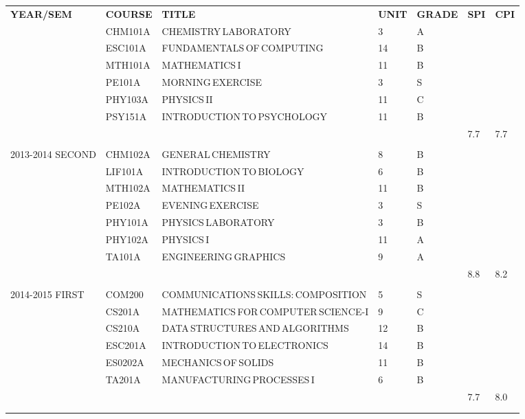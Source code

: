 \documentclass{article}
\newcommand{\transcriptentry}[6]{
		\scriptsize{#1} & \scriptsize{#2} & \scriptsize{#3} & \scriptsize{#4} & \scriptsize{#5} & \scriptsize{#6} \\ 
		}
\begin{document}
\begin{center}
	\begin{tabular}{m{4.1em}  m{1cm} m{6cm} m{0.5cm} m{0.85cm} m{0.2cm} m{0.2cm}} 
	\hdashline
	\scriptsize{\textbf{YEAR/SEM}} & \transcriptentry{\textbf{COURSE}}{\textbf{TITLE}}{\textbf{UNIT}}{\textbf{GRADE}}{\textbf{SPI}}{\textbf{CPI}}
	\hdashline
	\multirow{7}{5em}{\scriptsize{2013-2014 FIRST}}
		& \transcriptentry{CHM101A}{CHEMISTRY\,LABORATORY}{3}{A}{}{}
		& \transcriptentry{ESC101A}{FUNDAMENTALS\,OF\,COMPUTING}{14}{B}{}{}
		& \transcriptentry{MTH101A}{MATHEMATICS\,I}{11}{B}{}{}
		& \transcriptentry{PE101A}{MORNING\,EXERCISE}{3}{S}{}{}
		& \transcriptentry{PHY103A}{PHYSICS\,II}{11}{C}{}{}
		& \transcriptentry{PSY151A}{INTRODUCTION\,TO\,PSYCHOLOGY}{11}{B}{}{}
		& \transcriptentry{}{}{}{}{\small {7.7}}{\small{7.7}}
		\\
	\multirow{7}{5em}{\scriptsize{2013-2014 SECOND}}
		& \transcriptentry{CHM102A}{GENERAL\,CHEMISTRY}{8}{B}{}{}
		& \transcriptentry{LIF101A}{INTRODUCTION\,TO\,BIOLOGY}{6}{B}{}{}
		& \transcriptentry{MTH102A}{MATHEMATICS\,II}{11}{B}{}{}
		& \transcriptentry{PE102A}{EVENING\,EXERCISE}{3}{S}{}{}
		& \transcriptentry{PHY101A}{PHYSICS\,LABORATORY}{3}{B}{}{}
		& \transcriptentry{PHY102A}{PHYSICS\,I}{11}{A}{}{}
		& \transcriptentry{TA101A}{ENGINEERING\,GRAPHICS}{9}{A}{}{}
		& \transcriptentry{}{}{}{}{\small{8.8}}{\small{8.2}}
		\\	
	\multirow{7}{5em}{\scriptsize{2014-2015 FIRST}}
		& \transcriptentry{COM200}{COMMUNICATIONS\,SKILLS:\,COMPOSITION}{5}{S}{}{}
		& \transcriptentry{CS201A}{MATHEMATICS\,FOR\,COMPUTER\,SCIENCE-I}{9}{C}{}{}
		& \transcriptentry{CS210A}{DATA\,STRUCTURES\,AND\,ALGORITHMS}{12}{B}{}{}
		& \transcriptentry{ESC201A}{INTRODUCTION\,TO\,ELECTRONICS}{14}{B}{}{}
		& \transcriptentry{ES0202A}{MECHANICS\,OF\,SOLIDS}{11}{B}{}{}
		& \transcriptentry{TA201A}{MANUFACTURING\,PROCESSES\,I}{6}{B}{}{}
		& \transcriptentry{}{}{}{}{\small{7.7}}{\small{8.0}}\\
	\hdashline
	\end{tabular}
\end{center}
\end{document}

